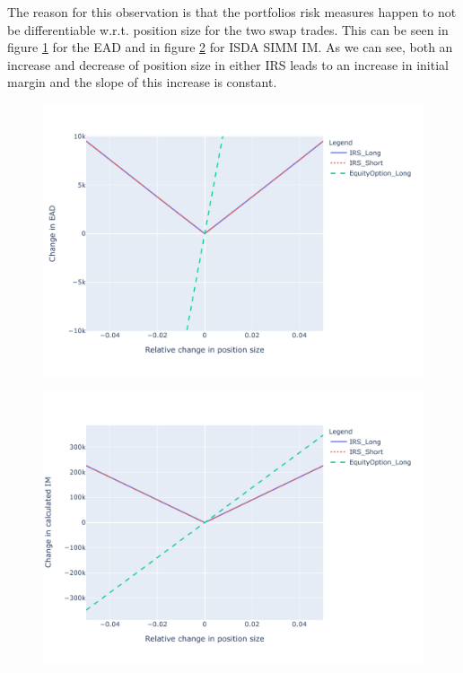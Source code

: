 \documentclass[../Thesis_AHoecherl.tex]{subfiles}
\begin{document}
    The reason for this observation is that the portfolios risk measures happen to not be differentiable w.r.t. position size for the two swap trades. This can be seen in figure \ref{fig:indifferentiability of ead} for the EAD and in figure \ref{fig:indifferentiability of im} for ISDA SIMM IM.
    As we can see, both an increase and decrease of position size in either IRS leads to an increase in initial margin and the slope of this increase is constant.

    \begin{figure}
        \centering
        \includegraphics{Graphics/Indifferentiabililty_of_EAD.pdf}
        \caption{}
        \label{fig:indifferentiability of ead}
    \end{figure}

    \begin{figure}
        \centering
        \includegraphics{Graphics/Indifferentiabililty_of_IM.pdf}
        \caption{}
        \label{fig:indifferentiability of im}
    \end{figure}
    
    
\end{document}

